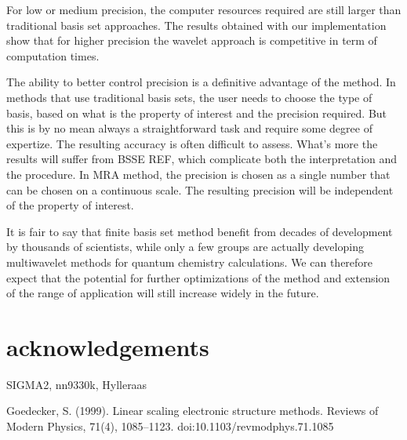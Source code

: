 \documentclass{article}
\begin{document}


For low or medium precision, the computer resources required are still larger than traditional basis set approaches. The results obtained with our implementation show that for higher precision the wavelet approach is competitive in term of computation times.

The ability to better control precision is a definitive advantage of the method. In methods that use traditional basis sets, the user needs to choose the type of basis, based on what is the property of interest and the precision required. But this is by no mean always a straightforward task and require some degree of expertize. The resulting accuracy is often difficult to assess. What's more the results will suffer from BSSE REF, which complicate both the interpretation and the procedure.
In MRA method, the precision is chosen as a single number that can be chosen on a continuous scale. The resulting precision will be independent of the property of interest. %



It is fair to say that finite basis set method benefit from decades of development by thousands of scientists, while only a few groups are actually developing multiwavelet methods for quantum chemistry calculations. We can therefore expect that the potential for further optimizations of the method and extension of the range of application will still increase widely in the future. %


\section{acknowledgements}
SIGMA2, nn9330k, Hylleraas






Goedecker, S. (1999). Linear scaling electronic structure methods. Reviews of Modern Physics, 71(4), 1085–1123. doi:10.1103/revmodphys.71.1085 
\end{document}
